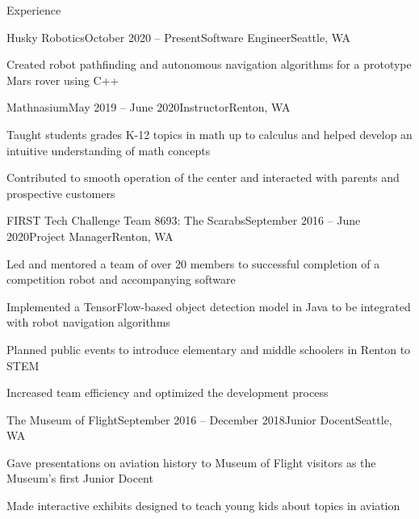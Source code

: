 \documentclass{resume} %
\begin{document}
\begin{rSection}{Experience}

\begin{rSubsection}{Husky Robotics}{October 2020 – Present}{Software Engineer}{Seattle, WA}
\item Created robot pathfinding and autonomous navigation algorithms for a prototype Mars rover using C++
\end{rSubsection}

\begin{rSubsection}{Mathnasium}{May 2019 – June 2020}{Instructor}{Renton, WA}
\item Taught students grades K-12 topics in math up to calculus and helped develop an intuitive understanding of math concepts
\item Contributed to smooth operation of the center and interacted with parents and prospective customers
\end{rSubsection}

\begin{rSubsection}{FIRST Tech Challenge Team 8693: The Scarabs}{September 2016 – June 2020}{Project Manager}{Renton, WA}
\item Led and mentored a team of over 20 members to successful completion of a competition robot and accompanying software
\item Implemented a TensorFlow-based object detection model in Java to be integrated with robot navigation algorithms
\item Planned public events to introduce elementary and middle schoolers in Renton to STEM
\item Increased team efficiency and optimized the development process
\end{rSubsection}

\begin{rSubsection}{The Museum of Flight}{September 2016 – December 2018}{Junior Docent}{Seattle, WA}
\item Gave presentations on aviation history to Museum of Flight visitors as the Museum's first Junior Docent
\item Made interactive exhibits designed to teach young kids about topics in aviation
\end{rSubsection}

\end{rSection}

\end{document}
